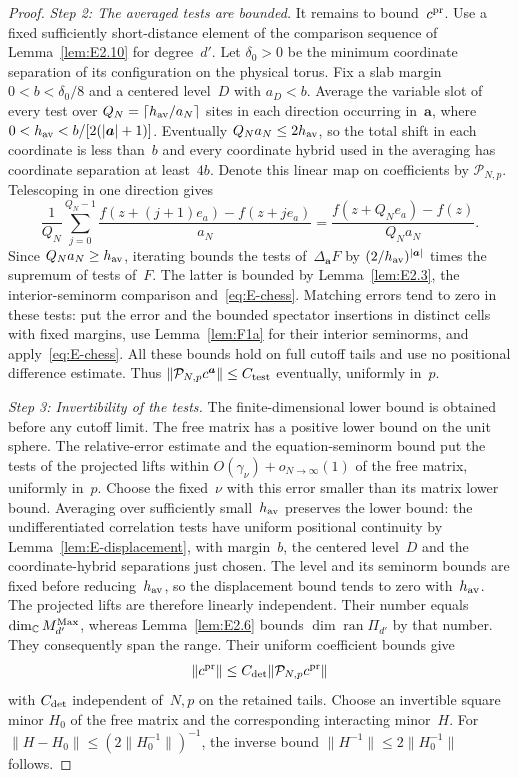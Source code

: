 \begin{proof}
\emph{Step 2: The averaged tests are bounded.} It remains to bound~$c^{\rm pr}$. Use a fixed sufficiently short-distance element of the comparison sequence of Lemma~\ref{lem:E2.10} for degree~$d'$. Let $\delta_0>0$ be the minimum coordinate separation of its configuration on the physical torus. Fix a slab margin $0<b<\delta_0/8$ and a centered level~$D$ with $a_D<b$. Average the variable slot of every test over $Q_N=\lceil h_{\rm av}/a_N\rceil$ sites in each direction occurring in~$\boldsymbol a$, where $0<h_{\rm av}<b/[2(|\boldsymbol a|+1)]$. Eventually $Q_Na_N\le2h_{\rm av}$, so the total shift in each coordinate is less than~$b$ and every coordinate hybrid used in the averaging has coordinate separation at least~$4b$. Denote this linear map on coefficients by $\mathcal P_{N,p}$. Telescoping in one direction gives
\begin{equation*}
\frac1{Q_N}\sum_{j=0}^{Q_N-1}
\frac{f(z+(j+1)e_a)-f(z+je_a)}{a_N}
=\frac{f(z+Q_Ne_a)-f(z)}{Q_Na_N}.
\end{equation*}
Since $Q_Na_N\ge h_{\rm av}$, iterating bounds the tests of~$\Delta_{\boldsymbol a}F$ by $(2/h_{\rm av})^{|\boldsymbol a|}$ times the supremum of tests of~$F$. The latter is bounded by Lemma~\ref{lem:E2.3}, the interior-seminorm comparison and~\eqref{eq:E-chess}. Matching errors tend to zero in these tests: put the error and the bounded spectator insertions in distinct cells with fixed margins, use Lemma~\ref{lem:F1a} for their interior seminorms, and apply~\eqref{eq:E-chess}. All these bounds hold on full cutoff tails and use no positional difference estimate. Thus $\|\mathcal P_{N,p}c^{\boldsymbol a}\|\le C_{\rm test}$ eventually, uniformly in~$p$.

\emph{Step 3: Invertibility of the tests.} The finite-dimensional lower bound is obtained before any cutoff limit. The free matrix has a positive lower bound on the unit sphere. The relative-error estimate and the equation-seminorm bound put the tests of the projected lifts within $O(\gamma_\nu)+o_{N\to\infty}(1)$ of the free matrix, uniformly in~$p$. Choose the fixed~$\nu$ with this error smaller than its matrix lower bound. Averaging over sufficiently small~$h_{\rm av}$ preserves the lower bound: the undifferentiated correlation tests have uniform positional continuity by Lemma~\ref{lem:E-displacement}, with margin~$b$, the centered level~$D$ and the coordinate-hybrid separations just chosen. The level and its seminorm bounds are fixed before reducing~$h_{\rm av}$, so the displacement bound tends to zero with~$h_{\rm av}$. The projected lifts are therefore linearly independent. Their number equals $\dim_{\mathbb{C}}M_{d'}^{\mathrm{Max}}$, whereas Lemma~\ref{lem:E2.6} bounds $\dim\operatorname{ran}\Pi_{d'}$ by that number. They consequently span the range. Their uniform coefficient bounds give
\begin{equation}\label{eq:E-detection}
\|c^{\rm pr}\|\le C_{\rm det}\|\mathcal P_{N,p}c^{\rm pr}\|
\end{equation}
with $C_{\rm det}$ independent of~$N,p$ on the retained tails. Choose an invertible square minor $H_0$ of the free matrix and the corresponding interacting minor~$H$. For $\|H-H_0\|\le(2\|H_0^{-1}\|)^{-1}$, the inverse bound $\|H^{-1}\|\le2\|H_0^{-1}\|$ follows.


\end{proof}
